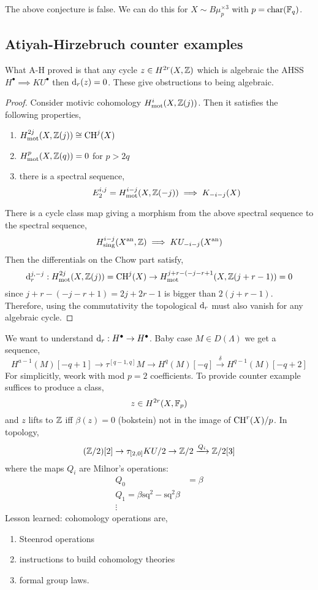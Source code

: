 \documentclass[12pt]{article}
\newcommand{\sq}{\mathrm{sq}}
\begin{document}
\begin{theorem}
The above conjecture is false. We can do this for $X \sim B \mu_p^{\times 3}$ with $p = \mathrm{char}(\mathbb{F}_q)$.
\end{theorem}

\subsection{Atiyah-Hirzebruch counter examples}

\newcommand{\mot}{\text{mot}}

What A-H proved is that any cycle $z \in H^{2r}(X, \mathbb{Z})$ which is algebraic the AHSS $H^\bullet \implies KU^\bullet$ then $\mathrm{d}_r(z) = 0$. These give obstructions to being algebraic. 

\begin{proof}
Consider motivic cohomology $H^i_{\mot}(X, \Z(j))$. Then it satisfies the following properties,
\begin{enumerate}
\item $H^{2j}_{\mot}(X, \Z(j)) \cong \CH^j(X)$
\item $H^p_{\mot}(X, \Z(q)) = 0$ for $p > 2 q$
\item there is a spectral sequence,
\[ E_2^{i,j} = H^{i-j}_{\mot}(X, \Z(-j)) \implies K_{-i-j}(X) \]
\end{enumerate}
There is a cycle class map giving a morphism from the above spectral sequence to the spectral sequence,
\[ H^{i-j}_{\text{sing}}(X^{\mathrm{an}}, \mathbb{Z}) \implies KU_{-i-j}(X^{\mathrm{an}}) \]
Then the differentials on the Chow part satisfy,
\[ \d_r^{j,-j} : H_{\mot}^{2j}(X, \Z(j)) = \CH^j(X) \to H_{\mot}^{j+r - (-j-r+1}(X, \Z(j+r-1)) = 0 \]
since $j+r - (-j-r+1) = 2j+2r - 1$ is bigger than $2(j + r - 1)$. Therefore, using the commutativity the topological $\mathrm{d}_r$ must also vanish for any algebraic cycle. 
\end{proof}

We want to understand $\mathrm{d}_r : H^\bullet \to H^\bullet$. Baby case $M \in D(\Lambda)$ we get a sequence,
\[ H^{a-1}(M)[-q+1] \to \tau^{[q-1,q]} M \to H^q(M)[-q] \xrightarrow{\delta} H^{q-1}(M)[-q+2]  \]
For simplicitly, weork with mod $p = 2$ coefficients. To provide counter example suffices to produce a class,
\[ z \in H^{2r}(X, \mathbb{F}_p) \]
and $z$ lifts to $\mathbb{Z}$ iff $\beta(z) = 0$ (bokstein) not in the image of $\mathrm{CH}^r(X) / p$. In topology,
\[ (\mathbb{Z}/2)[2] \to \tau_{[2,0]} KU/2 \to \mathbb{Z}/2 \xrightarrow{Q_i} \mathbb{Z}/2[3] \]
where the maps $Q_i$ are Milnor's operations:
\begin{align*}
Q_0 & = \beta
\\
Q_1 = \beta \sq^2 - \sq^2 \beta 
\\
\vdots
\end{align*}
Lesson learned: cohomology operations are,
\begin{enumerate}
\item Steenrod operations
\item instructions to build cohomology theories
\item formal group laws.
\end{enumerate}
\end{document}
